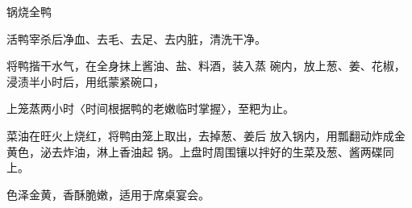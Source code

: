 \begin{recipe}{锅烧全鸭}

\ingredients


\cooking

\step 	活鸭宰杀后净血、去毛、去足、去内脏，清洗干净。

\step 	将鸭揩干水气，在全身抹上酱油、盐、料酒，装入蒸 碗内，放上葱、姜、花椒，浸渍半小时后，用纸蒙紧碗口，

上笼蒸两小时〈时间根据鸭的老嫩临时掌握〉，至粑为止。

\step 菜油在旺火上烧红，将鸭由笼上取出，去掉葱、姜后 放入锅内，用瓢翻动炸成金黄色，泌去炸油，淋上香油起 锅。上盘时周围镶以拌好的生菜及葱、酱两碟同上。

\notes

色泽金黄，香酥脆嫩，适用于席桌宴会。

\end{recipe}

